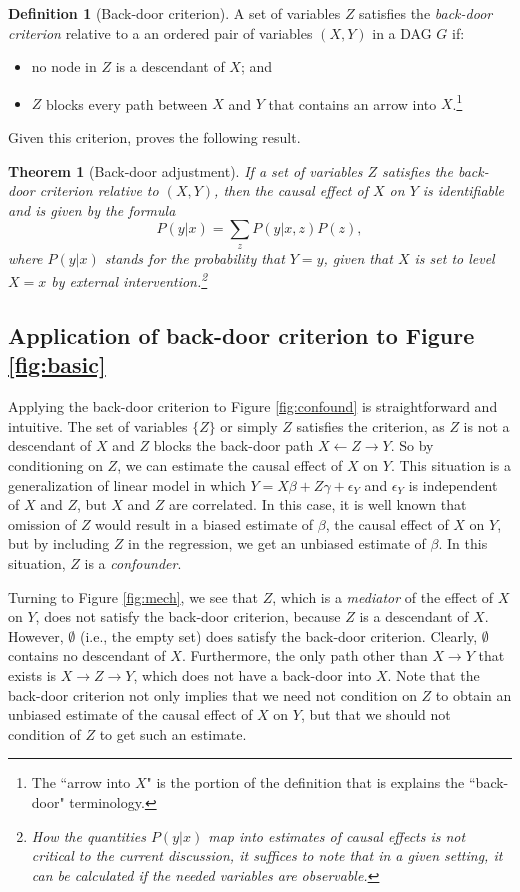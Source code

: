 \documentclass[12pt,reqno,titlepage]{amsart}
\newtheorem{theorem}{Theorem}
\theoremstyle{definition}
\newtheorem{definition}{Definition}
\begin{document}
\begin{definition}[Back-door criterion]
A set of variables $Z$ satisfies the \emph{back-door criterion} relative to a an ordered pair of variables $(X, Y)$ in a 
	DAG $G$ if:
	\begin{itemize}
		\item no node in $Z$ is a descendant of $X$; and
		\item $Z$ blocks every path between $X$ and $Y$ that contains an arrow into $X$.\footnote{The ``arrow into $X$" is the portion of the definition that is explains the ``back-door" terminology.}
	\end{itemize}
\end{definition}%
Given this criterion, \citet[p.\,79]{Pearl:2009vo} proves the following result.
%
\begin{theorem}[Back-door adjustment]
	If a set of variables $Z$ satisfies the back-door criterion relative to $(X, Y)$, then the causal effect of $X$ on $Y$ is identifiable and is given by the formula 
	\[ P(y | x) = \sum_{z} P(y | x, z) P(z), \]
where $P(y|x)$ stands for the probability that $Y = y$, given that $X$ is set to level $X=x$ by external intervention.\footnote{
How the quantities $P(y|x)$ map into estimates of causal effects is not critical to the current discussion, it suffices to note that in a given setting, it can be calculated if the needed variables are observable.}
\end{theorem}
%

 \subsection{Application of back-door criterion to Figure \ref{fig:basic}}
Applying the back-door criterion to Figure \ref{fig:confound} is straightforward and intuitive.
The set of variables $\{Z\}$ or simply $Z$ satisfies the criterion, as $Z$ is not a descendant of $X$ and $Z$ blocks the back-door path $X \leftarrow Z \rightarrow Y$.
So by conditioning on $Z$, we can estimate the causal effect of $X$ on $Y$.
This situation is a generalization of linear model in which $Y = X \beta + Z \gamma + \epsilon_Y$ and $\epsilon_Y$ is independent of $X$ and $Z$, but $X$ and $Z$ are correlated.
In this case, it is well known that omission of $Z$ would result in a biased estimate of $\beta$, the causal effect of $X$ on $Y$, but by including $Z$ in the regression, we get an unbiased estimate of $\beta$.
In this situation, $Z$ is a \emph{confounder}.

Turning to Figure \ref{fig:mech}, we see that $Z$, which is a \emph{mediator} of the effect of $X$ on $Y$, does not satisfy the back-door criterion, because $Z$ is a descendant of $X$.
However, $\emptyset$ (i.e., the empty set) does satisfy the back-door criterion.
Clearly, $\emptyset$ contains no descendant of $X$.
Furthermore, the only path other than $X \rightarrow Y$ that exists is $X \rightarrow Z \rightarrow Y$, which does not have a back-door into $X$.
Note that the back-door criterion not only implies that we need not condition on $Z$ to obtain an unbiased estimate of the causal effect of $X$ on $Y$, but that we should not condition of $Z$ to get such an estimate.
\end{document}
